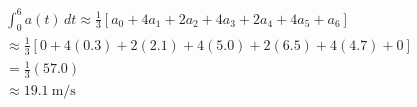 \documentclass[preview]{standalone}
\begin{document}
\begin{align*}
\int_0^{6} a(t)\,dt \approx \frac{1}{3}\left[ a_0 + 4a_1 + 2a_2 + 4a_3 + 2a_4 + 4a_5 + a_6 \right] \\[4pt] \approx \frac{1}{3} \left[ 0 + 4(0.3) + 2(2.1) + 4(5.0) + 2(6.5) + 4(4.7) + 0 \right] \\[4pt] = \frac{1}{3}(57.0) \\[4pt] \approx 19.1\ \text{m/s}
\end{align*}
\end{document}
